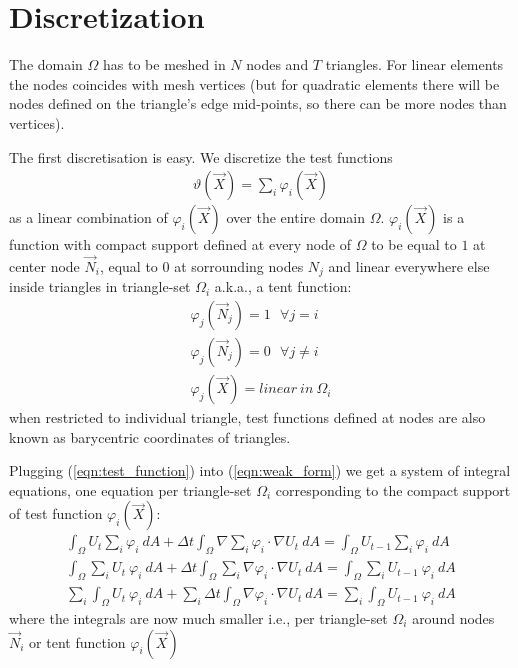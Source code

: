 \documentclass{birkjour}
\numberwithin{equation}{section}
\begin{document}
\section{Discretization}
\label{sec:discretization} 

The domain $\Omega$ has to be meshed in $N$ nodes and $T$ triangles. For linear elements the nodes coincides with 
mesh vertices (but for quadratic elements there will be nodes defined on the triangle's edge mid-points, 
so there can be more nodes than vertices).

The first discretisation is easy. We discretize the test functions 
\begin{eqnarray}
	\label{eqn:test_function}
	\vartheta(\vec X) = \sum_i { \varphi_i(\vec X) }
\end{eqnarray} 
as a linear combination of $\varphi_i(\vec X)$ over the entire domain $\Omega$. $\varphi_i(\vec X)$ is a function with compact support 
defined at every node of $\Omega$ to be equal to $1$ at center node $\vec N_i$, equal to $0$ at 
sorrounding nodes $N_j$ and linear everywhere else inside triangles in triangle-set $\Omega_i$ a.k.a., a tent function:
\begin{eqnarray}
	\varphi_j(\vec N_j) = 1 \ \ \  \forall j = i \nonumber\\
	\varphi_j(\vec N_j) = 0 \ \ \  \forall j \neq i \nonumber\\
	\varphi_j(\vec X) = linear \ in \ \Omega_i \nonumber
\end{eqnarray}
when restricted to individual triangle, test functions defined at nodes are also known as barycentric coordinates of triangles.

Plugging (\ref{eqn:test_function}) into (\ref{eqn:weak_form}) we get a system of integral equations, 
one equation per triangle-set $\Omega_i$ corresponding to the compact
support of test function $\varphi_i(\vec X)$:
\begin{eqnarray}
	\int_{\Omega}{ U_t \sum_i { \varphi_i } \ dA } + \Delta t \int_{\Omega}{ \nabla \sum_i { \varphi_i } \cdot \nabla U_t \ dA} = \int_{\Omega} { U_{t-1} \sum_i { \varphi_i } \ dA } \nonumber\\
	\int_{\Omega}{ \sum_i { U_t  \ \varphi_i } \ dA } + \Delta t \int_{\Omega}{ \sum_i { \nabla  \varphi_i \cdot \nabla U_t } \ dA} = \int_{\Omega} { \sum_i { U_{t-1}  \ \varphi_i } \ dA } \nonumber\\
	\sum_i { \int_{\Omega}{ U_t  \ \varphi_i  \ dA } } + \sum_i { \Delta t \int_{\Omega}{ \nabla  \varphi_i \cdot \nabla U_t \ dA}} = \sum_i { \int_{\Omega} { U_{t-1}  \ \varphi_i \ dA } } \nonumber
\end{eqnarray}
where the integrals are now much smaller i.e., per triangle-set $\Omega_i$ around nodes $\vec N_i$ or tent function $\varphi_i(\vec X)$
\end{document}
